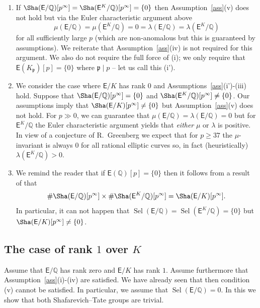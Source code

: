 \documentclass{amsart}
\newcommand{\KM}[1]{\textcolor{OliveGreen}{#1}}
\numberwithin{equation}{section}
\theoremstyle{remark}
\newcommand{\Sel}{\operatorname{Sel}}
\newcommand{\Q}{\mathbb{Q}}
\newcommand{\EC}{\mathsf{E}}
\newcommand{\fp}{\mathfrak{p}}
\theoremstyle{plain} %
\begin{document}
\begin{enumerate}[label = (\roman*)]
\item If $\Sha(\EC/\Q)[p^\infty] = \Sha(\EC^K/\Q)[p^\infty] =\{0\}$ then Assumption~\ref{ass}(v) does not hold but via the Euler characteristic argument above
\[
\mu(\EC/\Q)= \mu(\EC^K/\Q) = 0= \lambda(\EC/\Q) = \lambda(\EC^K/\Q)
\]
for all sufficiently large $p$ (which are non-anomalous but this is guaranteed by assumptions).
We reiterate that Assumption~\ref{ass}(iv) is not required for this argument.
We also do not require the full force of (i); we only require that $\EC(K_{\fp})[p]=\{0\}$ where $\fp\mid p$ -- let us call this (i').


\item We consider the case where $\EC/K$ has rank 0 and Assumptions~\ref{ass}(i')-(iii) hold.
Suppose that $\Sha(\EC/\Q)[p^\infty]=\{0\}$ and $\Sha(\EC^K/\Q)[p^\infty]\neq \{0\}$.
Our assumptions imply that $\Sha(\EC/K)[p^\infty]\neq \{0\}$ but Assumption~\ref{ass}(v) does not hold.
For $p\gg0$, we can guarantee that $\mu(\EC/\Q) = \lambda(\EC/\Q) =0$ but for $\EC^K/\Q$ the Euler characteristic argument yields that \emph{either} $\mu$ or $\lambda$ is positive.
In view of a conjecture of R.~Greenberg we expect that for $p\geq 37$ the $\mu$-invariant is always 0 for all rational elliptic curves so, in fact (heuristically) $\lambda(\EC^K/\Q)>0$.

\item We remind the reader that if $\EC(\Q)[p]=\{0\}$ then it follows from a result of \cite[p.~5051]{Qiu14} that
\[
\# \Sha(\EC/\Q)[p^\infty] \times \# \Sha(\EC^K/\Q)[p^\infty] = \Sha(\EC/K)[p^\infty].
\]
In particular, it can not happen that $\Sel(\EC/\Q) = \Sel(\EC^K/\Q)= \{0\}$ but $\Sha(\EC/K)[p^\infty]\neq \{0\}$.
\end{enumerate}

\subsection{The case of rank $1$ over $K$}
Assume that $\EC/\Q$ has rank zero and $\EC/K$ has rank $1$.
Assume furthermore that Assumption~\ref{ass}(i)-(iv) are satisfied.
We have already seen that then condition (v) cannot be satisfied.
In particular, we assume that $\Sel(\EC/\Q)=0$.
In this we show that both Shafarevich--Tate groups are trivial.
\end{document}
